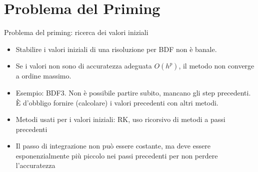 \documentclass[aspectratio=169, 10pt, handout,usenames,dvipsnames]{beamer}
\begin{document}

\section{Problema del Priming}\label{sec:sec7}
    \begin{frame}{Problema del priming: ricerca dei valori iniziali}
        \begin{itemize}
            \item Stabilire i valori iniziali di una risoluzione per BDF non è banale.
            \item Se i valori non sono di accuratezza adeguata $O(h^p)$, il metodo non converge a ordine massimo.
            \item Esempio: BDF3. Non è possibile partire subito, mancano gli step precedenti.\\
            È d'obbligo fornire (calcolare) i valori precedenti con altri metodi.
            \item Metodi usati per i valori iniziali: RK, uso ricorsivo di metodi a passi precedenti
            \item Il passo di integrazione non può essere costante, ma deve essere esponenzialmente più piccolo nei passi precedenti per non perdere l'accuratezza
        \end{itemize}
    \end{frame}
\end{document}
